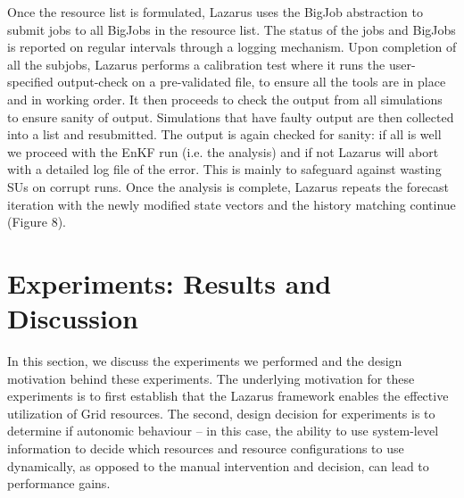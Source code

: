 \documentclass{sig-alternate}
\begin{document}
Once the resource list is formulated, Lazarus uses the BigJob
abstraction to submit jobs to all BigJobs in the resource list. The
status of the jobs and BigJobs is reported on regular intervals
through a logging mechanism. Upon completion of all the subjobs,
Lazarus performs a calibration test where it runs the user-specified
output-check on a pre-validated file, to ensure all the tools are in
place and in working order. It then proceeds to check the output from
all simulations to ensure sanity of output. Simulations that have
faulty output are then collected into a list and resubmitted. The
output is again checked for sanity: if all is well we proceed with the
EnKF run (i.e. the analysis) and if not Lazarus will abort with a
detailed log file of the error. This is mainly to safeguard against
wasting SUs on corrupt runs. Once the analysis is complete, Lazarus
repeats the forecast iteration with the newly modified state vectors
and the history matching continue (Figure 8).


\section{Experiments: Results and Discussion}

In this section, we discuss the experiments we performed and the design motivation behind these experiments. %
The underlying motivation for these experiments is to first establish that the Lazarus framework enables the effective utilization of Grid resources. The second, design decision for experiments is to determine if autonomic behaviour -- in this case, the ability to use system-level information to decide which resources and resource configurations to use dynamically, as opposed to the manual intervention and decision, can lead to performance gains.
\end{document}
